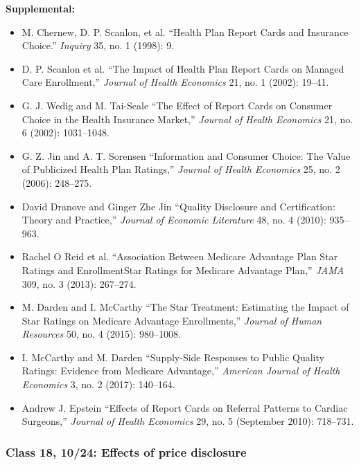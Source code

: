 \documentclass[11pt,]{article}
\providecommand{\tightlist}{%
  \setlength{\itemsep}{0pt}\setlength{\parskip}{0pt}}
\begin{document}
\textbf{Supplemental:}

\begin{itemize}
\tightlist
\item
  M. Chernew, D. P. Scanlon, et al. {``Health Plan Report Cards and
  Insurance Choice.''} \emph{Inquiry} 35, no. 1 (1998): 9.
\item
  D. P. Scanlon et al. {``The Impact of Health Plan Report Cards on
  Managed Care Enrollment,''} \emph{Journal of Health Economics} 21, no.
  1 (2002): 19--41.
\item
  G. J. Wedig and M. Tai-Seale {``The Effect of Report Cards on Consumer
  Choice in the Health Insurance Market,''} \emph{Journal of Health
  Economics} 21, no. 6 (2002): 1031--1048.
\item
  G. Z. Jin and A. T. Sorensen {``Information and Consumer Choice: The
  Value of Publicized Health Plan Ratings,''} \emph{Journal of Health
  Economics} 25, no. 2 (2006): 248--275.
\item
  David Dranove and Ginger Zhe Jin {``Quality {Disclosure} and
  {Certification}: {Theory} and {Practice},''} \emph{Journal of Economic
  Literature} 48, no. 4 (2010): 935--963.
\item
  Rachel O Reid et al. {``Association {Between} {Medicare} {Advantage}
  {Plan} {Star} {Ratings} and {EnrollmentStar} {Ratings} for {Medicare}
  {Advantage} {Plan},''} \emph{JAMA} 309, no. 3 (2013): 267--274.
\item
  M. Darden and I. McCarthy {``The {Star} {Treatment}: {Estimating} the
  {Impact} of {Star} {Ratings} on {Medicare} {Advantage}
  {Enrollments},''} \emph{Journal of Human Resources} 50, no. 4 (2015):
  980--1008.
\item
  I. McCarthy and M. Darden {``Supply-Side {Responses} to {Public}
  {Quality} {Ratings}: {Evidence} from {Medicare} {Advantage},''}
  \emph{American Journal of Health Economics} 3, no. 2 (2017): 140--164.
\item
  Andrew J. Epstein {``Effects of Report Cards on Referral Patterns to
  Cardiac Surgeons,''} \emph{Journal of Health Economics} 29, no. 5
  (September 2010): 718--731.
\end{itemize}

\hypertarget{class-18-1024-effects-of-price-disclosure}{%
\subsubsection{Class 18, 10/24: Effects of price
disclosure}\label{class-18-1024-effects-of-price-disclosure}}
\end{document}
